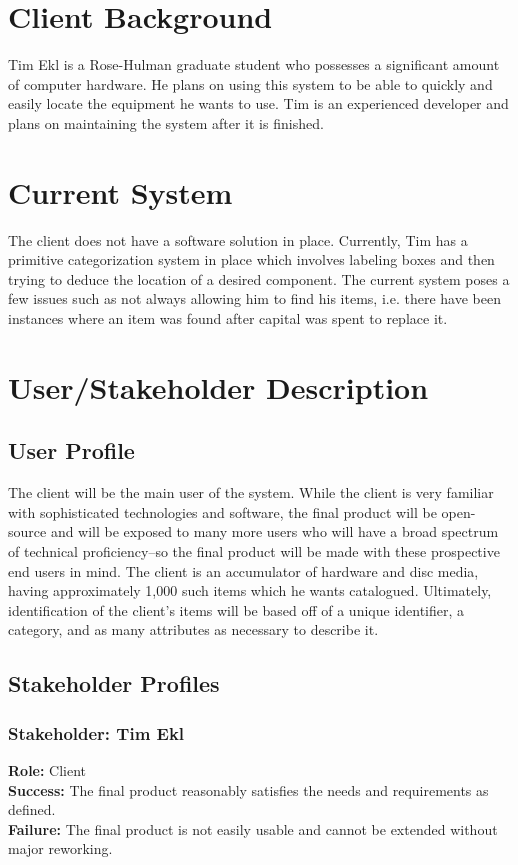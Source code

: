 \documentclass{article}
\begin{document}
\section{Client Background}
Tim Ekl is a Rose-Hulman graduate student who possesses a significant amount of computer hardware.  He plans on using this system to be able to quickly and easily locate the equipment he wants to use.  Tim is an experienced developer and plans on maintaining the system after it is finished.  

\section{Current System}
The client does not have a software solution in place.  Currently, Tim has a primitive categorization system in place which involves labeling boxes and then trying to deduce the location of a desired component.  The current system poses a few issues such as not always allowing him to find his items, i.e. there have been instances where an item was found after capital was spent to replace it.

\section{User/Stakeholder Description}

\subsection{User Profile}
The client will be the main user of the system. While the client is very familiar with sophisticated technologies and software, the final product will be open-source and will be exposed to many more users who will have a broad spectrum of technical proficiency--so the final product will be made with these prospective end users in mind. The client is an accumulator of hardware and disc media, having approximately 1,000 such items which he wants catalogued. Ultimately, identification of the client's items will be based off of a unique identifier, a category, and as many attributes as necessary to describe it.

\subsection{Stakeholder Profiles}

\subsubsection{Stakeholder: Tim Ekl}
\textbf{Role:} Client\\
\textbf{Success:} The final product reasonably satisfies the needs and requirements as defined.\\
\textbf{Failure:} The final product is not easily usable and cannot be extended without major reworking.
\end{document}
